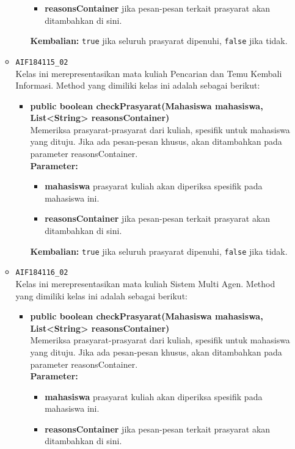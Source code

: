 \begin{enumerate}
\begin{itemize}
\begin{itemize}
\begin{itemize}
				\item \textbf{reasonsContainer} jika pesan-pesan terkait prasyarat akan ditambahkan di sini.
			\end{itemize}
			\textbf{Kembalian:} \texttt{true} jika seluruh prasyarat dipenuhi, \texttt{false} jika tidak.
		\end{itemize}
		\item \texttt{AIF184115\_02} \\
		Kelas ini merepresentasikan mata kuliah Pencarian dan Temu Kembali Informasi. Method yang dimiliki kelas ini adalah sebagai berikut: 
		\begin{itemize}
			\item \textbf{public boolean checkPrasyarat(Mahasiswa mahasiswa, List<String> reasonsContainer)}\\
			Memeriksa prasyarat-prasyarat dari kuliah, spesifik untuk mahasiswa yang dituju. Jika ada pesan-pesan khusus, akan ditambahkan pada parameter reasonsContainer.\\
			\textbf{Parameter:}
			\begin{itemize}
				\item \textbf{mahasiswa} prasyarat kuliah akan diperiksa spesifik pada mahasiswa ini.
				\item \textbf{reasonsContainer} jika pesan-pesan terkait prasyarat akan ditambahkan di sini.
			\end{itemize}
			\textbf{Kembalian:} \texttt{true} jika seluruh prasyarat dipenuhi, \texttt{false} jika tidak.
		\end{itemize}
		\item \texttt{AIF184116\_02} \\
		Kelas ini merepresentasikan mata kuliah Sistem Multi Agen. Method yang dimiliki kelas ini adalah sebagai berikut: 
		\begin{itemize}
			\item \textbf{public boolean checkPrasyarat(Mahasiswa mahasiswa, List<String> reasonsContainer)}\\
			Memeriksa prasyarat-prasyarat dari kuliah, spesifik untuk mahasiswa yang dituju. Jika ada pesan-pesan khusus, akan ditambahkan pada parameter reasonsContainer.\\
			\textbf{Parameter:}
			\begin{itemize}
				\item \textbf{mahasiswa} prasyarat kuliah akan diperiksa spesifik pada mahasiswa ini.
				\item \textbf{reasonsContainer} jika pesan-pesan terkait prasyarat akan ditambahkan di sini.

\end{itemize}
\end{itemize}
\end{itemize}
\end{enumerate}
